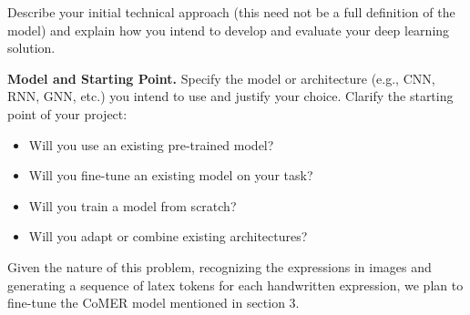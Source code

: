 \documentclass[11pt]{article}
\newcommand{\blue}[1]{\textcolor{cyan!60!black}{#1}}
\begin{document}
Describe your initial technical approach (this need not be a full definition of the model) and explain how you intend
to develop and evaluate your deep learning solution.

{\bf Model and Starting Point.}
Specify the model or architecture (e.g., CNN, RNN, GNN, etc.) you intend to use and justify your choice. Clarify the starting point of your project:
\begin{itemize}[noitemsep]
    \item Will you use an existing pre-trained model?
    \item Will you fine-tune an existing model on your task?
    \item Will you train a model from scratch?
    \item Will you adapt or combine existing architectures?
\end{itemize}

\blue{Given the nature of this problem, recognizing the expressions in images
and generating a sequence of latex tokens for each handwritten expression, we
plan to fine-tune the CoMER model mentioned in section 3.}
\end{document}
